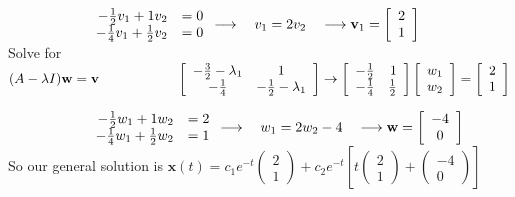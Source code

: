\documentclass[12pt]{article}
\begin{document}
\begin{enumerate}
    $\hspace*{2cm}\begin{array}{rr} -\frac{1}{2}v_1 + 1v_2 &=0 \\ -\frac{1}{4}v_1 + \frac{1}{2}v_2 &=0 \end{array} 
     \longrightarrow \quad v_1=2v_2 \quad \longrightarrow \mathbf{v}_1 =\left[\begin{array}{cc} 2 \\ 1 \end{array}\right]$ \\

    \hspace*{2cm}Solve for $ (A - \lambda I)\mathbf{w} = \mathbf{v} \\ 
    \hspace*{2cm}\left[\begin{array}{cc} -\frac{3}{2} - \lambda_1 & 1\\ -\frac{1}{4} & -\frac{1}{2} - \lambda_1\end{array}\right]
    \rightarrow \left[\begin{array}{rr} -\frac{1}{2}& 1\\ -\frac{1}{4} & \frac{1}{2} \end{array}\right] \left[\begin{array}{cc} w_1 \\ w_2 \end{array}\right] = \left[\begin{array}{cc} 2 \\ 1 \end{array}\right]$

    $\hspace*{2cm}\begin{array}{rr} -\frac{1}{2}w_1 + 1w_2 & = 2 \\ -\frac{1}{4}w_1 + \frac{1}{2}w_2 & = 1 \end{array} 
     \longrightarrow \quad w_1=2w_2-4 \quad \longrightarrow \mathbf{w} =\left[\begin{array}{cc} -4 \\ 0 \end{array}\right]$ \\

    So our general solution is $\mathbf{x}(t) = c_1e^{-t}\begin{pmatrix} 2 \\ 1 \end{pmatrix}+ c_2e^{-t}\left[ t \begin{pmatrix} 2 \\ 1 \end{pmatrix} + \begin{pmatrix} -4 \\ 0 \end{pmatrix}\right]$

\end{enumerate}
\end{document}
